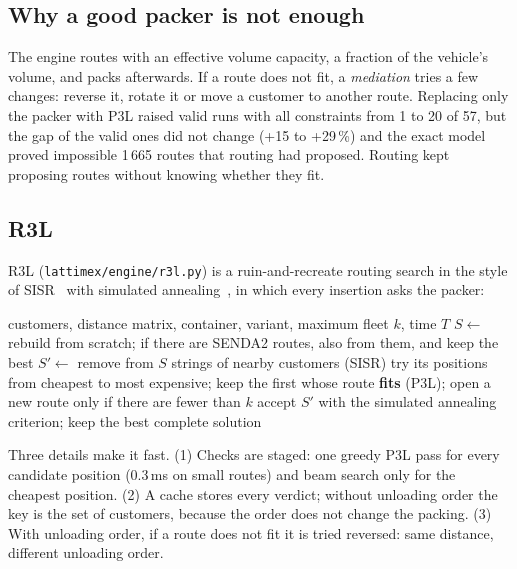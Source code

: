 \documentclass[11pt,a4paper]{article}
\newcommand{\sendados}{SENDA2}
\newcommand{\tsl}[1]{\texttt{\small #1}}
\begin{document}
\subsection{Why a good packer is not enough}

The engine routes with an effective volume capacity, a fraction of the vehicle's volume, and packs
afterwards. If a route does not fit, a \emph{mediation} tries a few changes: reverse it, rotate it or
move a customer to another route. Replacing only the packer with P3L raised valid runs with all
constraints from 1 to 20 of 57, but the gap of the valid ones did not change (+15 to +29\,\%) and the
exact model proved impossible 1\,665 routes that routing had proposed. Routing kept proposing routes
without knowing whether they fit.

\subsection{R3L}

R3L (\tsl{lattimex/engine/r3l.py}) is a ruin-and-recreate routing search in the style of
SISR~\cite{christiaens2020} with simulated annealing~\cite{kirkpatrick1983}, in which every insertion
asks the packer:

\begin{algorithm}[H]
\caption{R3L (outline)}
\begin{algorithmic}[1]
\Require customers, distance matrix, container, variant, maximum fleet $k$, time $T$
\State $S \gets$ rebuild from scratch; if there are \sendados{} routes, also from them, and keep the best
  \State $S' \gets$ remove from $S$ strings of nearby customers (SISR)
    \State try its positions from cheapest to most expensive;
    \State keep the first whose route \textbf{fits} (P3L); open a new route only if there are fewer than $k$
  \EndFor
  \State accept $S'$ with the simulated annealing criterion; keep the best complete solution
\EndWhile
\end{algorithmic}
\end{algorithm}

Three details make it fast. (1) Checks are staged: one greedy P3L pass for every candidate position
(0.3\,ms on small routes) and beam search only for the cheapest position. (2) A cache stores every
verdict; without unloading order the key is the set of customers, because the order does not change the
packing. (3) With unloading order, if a route does not fit it is tried reversed: same distance,
different unloading order.
\end{document}

